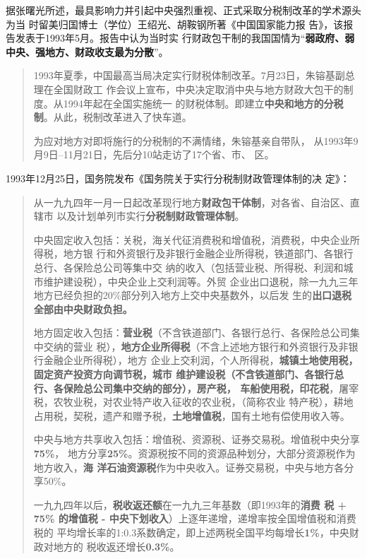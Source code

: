 据张曙光所述，最具影响力并引起中央强烈重视、正式采取分税制改革的学术源头为当
时留美归国博士（学位）王绍光、胡鞍钢所著《中国国家能力报
告》，该报告发表于1993年5月。报告中认为当时实
行财政包干制的我国国情为“\textbf{弱政府、弱中央、强地方、财政收支最为分散}”。

\begin{quotation}
  1993年夏季，中国最高当局决定实行财税体制改革。7月23日，朱镕基副总理在全国财政工
  作会议上宣布，中央决定取消中央与地方财政大包干的制度。从1994年起在全国实施统一
  的财税体制。即建立\textbf{中央和地方的分税制}。从此，税制改革进入了快车道。

  为应对地方对即将施行的分税制的不满情绪，朱镕基亲自带队，
  从1993年9月9日--11月21日，先后分10站走访了17个省、市、
  区。
\end{quotation}

1993年12月25日，国务院发布《国务院关于实行分税制财政管理体制的决
定》：

\begin{quotation}
  从一九九四年一月一日起改革现行地方\textbf{财政包干体制}，对各省、自治区、直辖市
  以及计划单列市实行\textbf{分税制财政管理体制}。

  中央固定收入包括：关税，海关代征消费税和增值税，消费税，中央企业所得税，地方银
  行和外资银行及非银行金融企业所得税，铁道部门、各银行总行、各保险总公司等集中交
  纳的收入（包括营业税、所得税、利润和城市维护建设税），中央企业上交利润等。外贸
  企业出口退税，除一九九三年地方已经负担的20\%部分列入地方上交中央基数外，以后发
  生的\textbf{出口退税全部由中央财政负担。}

  地方固定收入包括：\textbf{营业税}（不含铁道部门、各银行总行、各保险总公司集中交纳的营业
  税），\textbf{地方企业所得税}（不含上述地方银行和外资银行及非银行金融企业所得税），地方
  企业上交利润，个人所得税，\textbf{城镇土地使用税，固定资产投资方向调节税，城市
    维护建设税（不含铁道部门、各银行总行、各保险总公司集中交纳的部分），房产税，
    车船使用税，印花税}，屠宰税，农牧业税，对农业特产收入征收的农业税，（简称农业
  特产税），耕地占用税，契税，遗产和赠予税，\textbf{土地增值税}，国有土地有偿使用收入等。

  中央与地方共享收入包括：增值税、资源税、证券交易税。增值税中央分享\textbf{75\%}，
  地方分享\textbf{25\%}。资源税按不同的资源品种划分，大部分资源税作为地方收入，\textbf{海
    洋石油资源税}作为中央收入。证券交易税，中央与地方各分享50\%。

  一九九四年以后，\textbf{税收返还额}在一九九三年基数（即1993年的\textbf{消费
    税 + 75\% 的增值税 - 中央下划收入}）上逐年递增，递增率按全国增值税和消费税的
  平均增长率的1:0.3系数确定，即上述两税全国平均每增长\textbf{1\%}，中央财政对地方的
  税收返还增长\textbf{0.3\%}。
\end{quotation}

